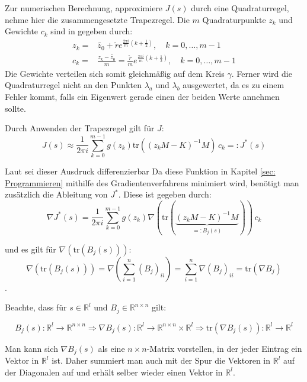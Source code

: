 \documentclass[a4paper,12pt]{report}
\newcommand{\R}{\mathbb R}
\newcommand{\klammer}[1]{\left(#1\right)}
\newcommand{\tr}{\text{tr}}
\newcommand{\inv}{^{-1}}
\newcommand{\1}{\mathds{1}}
\theoremstyle{plain} %
\theoremstyle{definition} %
\theoremstyle{remark}
\begin{document}
            Zur numerischen Berechnung, approximiere $J(s)$ durch eine Quadraturregel, nehme hier die zusammengesetzte Trapezregel.
            Die $m$ Quadraturpunkte $z_k$ und Gewichte $c_k$ sind in \cite[S. 128]{grundlageFutamura} gegeben durch:
            \begin{align}
                  z_k =& \widetilde{z_0}+ \widetilde{r}e^{\frac{2\pi i}{m}\klammer{k+\frac 1 2}},\quad k=0,\dots,m-1\\
                  c_k =& \frac{z_k-\widetilde{z_0}}{m} = \frac {\widetilde{r}} m e^{\frac{2\pi i}{m}\klammer{k+\frac 1 2}},\quad k=0,\dots,m-1
            \end{align}
            Die Gewichte verteilen sich somit gleichmäßig auf dem Kreis $\gamma$. Ferner wird die Quadraturregel nicht an den Punkten $\lambda_a$ und $\lambda_b$ ausgewertet, da es zu einem Fehler kommt, falls ein Eigenwert gerade einen der beiden Werte annehmen sollte.
            
            Durch Anwenden der Trapezregel gilt für $J$:
            $$J(s) \approx \frac 1 {2\pi i}\sum_{k=0}^{m-1} g(z_k) \tr((z_kM-K)\inv M)\,c_k =:J^*(s)$$

            Laut \cite[S. 4]{hauptteilTkachuk} sei dieser Ausdruck differenzierbar
            Da diese Funktion in Kapitel \ref{sec: Programmieren} mithilfe des Gradientenverfahrens minimiert wird, benötigt man zusätzlich die Ableitung von $J^*$. Diese ist gegeben durch:
            \begin{equation}
                  \label{eqn: AbleitungZielfunktion}
                  \nabla J^*(s) = \frac 1 {2\pi i}\sum_{k=0}^{m-1} g(z_k) \nabla \klammer{\tr(\underbrace{(z_kM-K)\inv M}_{=:B_j(s)})}\,c_k
            \end{equation}

            und es gilt für $\nabla \klammer{\tr(B_j(s))}$:
            $$\nabla \klammer{\tr(B_j(s))} = \nabla \klammer{\sum_{i=1}^n (B_j)_{ii}} = \sum_{i=1}^n \nabla (B_j)_{ii} = \tr(\nabla B_j)$$.

            Beachte, dass für $s\in \R^l$ und $B_j \in \R^{n\times n}$ gilt:

            $$B_j(s): \R^l \to \R^{n\times n}\Rightarrow \nabla B_j(s) : \R^l\to \R^{n\times n}\times \R^l \Rightarrow \tr(\nabla B_j(s)): \R^l \to \R^l$$

            Man kann sich $\nabla B_j(s)$ als eine $n\times n$-Matrix vorstellen, in der jeder Eintrag ein Vektor in $\R^l$ ist.
            Daher summiert man auch mit der Spur die Vektoren in $\R^l$ auf der Diagonalen auf und erhält selber wieder einen Vektor in $\R^l$.
            
\end{document}
